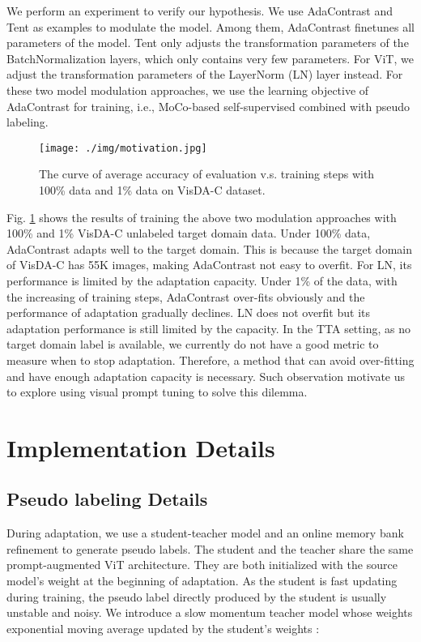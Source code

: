\documentclass{article} \usepackage{iclr2023_conference,times}
\begin{document}
We perform an experiment to verify our hypothesis. We use AdaContrast \citep{chen2022contrastive} and Tent \citep{wang2020tent} as examples to modulate the model. Among them, AdaContrast finetunes all parameters of the model. Tent only adjusts the transformation parameters of the BatchNormalization layers, which only contains very few parameters. For ViT, we adjust the transformation parameters of the LayerNorm (LN) layer instead. For these two model modulation approaches, we use the learning objective of AdaContrast for training, i.e., MoCo-based self-supervised combined with pseudo labeling. 


\begin{figure}[h]
\begin{center}
\texttt{[image: ./img/motivation.jpg]}
\end{center}
\caption{The curve of average accuracy of evaluation v.s. training steps with 100\% data and 1\% data on VisDA-C dataset.}
\label{fig:motivation}
\end{figure}
 
Fig. \ref{fig:motivation} shows the results of training the above two modulation approaches with 100\% and 1\% VisDA-C unlabeled target domain data. Under 100\% data, AdaContrast adapts well to the target domain. This is because the target domain of VisDA-C has 55K images, making AdaContrast not easy to overfit. For LN, its performance is limited by the adaptation capacity. Under 1\% of the data, with the increasing of training steps, AdaContrast over-fits obviously and the performance of adaptation gradually declines. LN does not overfit but its adaptation performance is still limited by the capacity. In the TTA setting, as no target domain label is available, we currently do not have a good metric to measure when to stop adaptation. Therefore, a method that can avoid over-fitting and have enough adaptation capacity is necessary. Such observation motivate us to explore using visual prompt tuning to solve this dilemma.

\section{Implementation Details}

\subsection{Pseudo labeling Details} \label{appendix:pl}

During adaptation, we use a student-teacher model and an online memory bank refinement to generate pseudo labels. The student and the teacher share the same prompt-augmented ViT architecture. They are both initialized with the source model's weight  at the beginning of adaptation. As the student is fast updating during training, the pseudo label directly produced by the student is usually unstable and noisy. We introduce a slow momentum teacher model whose weights exponential moving average updated by the student's weights :
\end{document}
